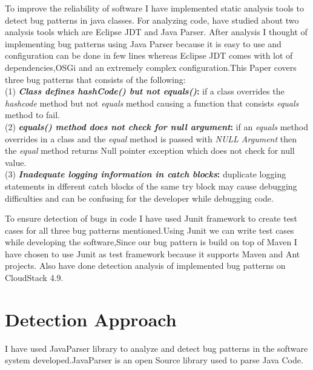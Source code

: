 \documentclass[sigplan,screen]{acmart}
\begin{document}
To improve the reliability of software I have implemented static analysis tools to detect bug patterns in java classes. For analyzing code, have studied about two analysis tools which are Eclipse JDT and Java Parser. After analysis I thought of implementing bug patterns using Java Parser because it is easy to use and configuration can be done in few lines whereas Eclipse JDT comes with lot of dependencies,OSGi and an extremely complex configuration.This Paper covers three bug patterns that consists of the following:\\
(1) \textbf{\emph{Class defines hashCode() but not equals()}:} if a class overrides the \emph{hashcode} method but not \emph{equals} method causing a function that consists \emph{equals} method to fail.\\
(2) \textbf{\emph{equals() method does not check for null argument}:} if an \emph{equals} method overrides in a class and the \emph{equal} method is passed with
\emph{NULL Argument} then the \emph{equal} method returns Null pointer exception which does not check for null value.\\
(3) \textbf{\emph{Inadequate logging information in catch blocks}:} duplicate logging statements in dfferent catch blocks of the same try block may cause debugging difficulties and can be confusing
for the developer while debugging code.

To ensure detection of bugs in code I have used Junit framework to create test cases for all three bug patterns mentioned.Using Junit we can write test cases while developing the software,Since our bug pattern is build on top of Maven I have chosen to use Junit as test framework because it supports Maven and Ant projects.  Also have done detection analysis of implemented bug patterns on CloudStack 4.9.

\section{Detection Approach}
I have used JavaParser library to analyze and detect bug patterns in the software system developed.JavaParser is an open Source library used to parse Java Code.
\end{document}
